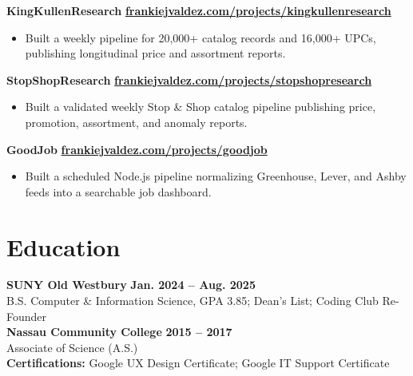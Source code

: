 \documentclass[10pt,letterpaper]{article}
\newcommand{\resumeTitle}[1]{{\fontsize{9.65}{11.35}\selectfont\textbf{#1}}}
\begin{document}
\resumeTitle{KingKullenResearch} \hfill \href{https://frankiejvaldez.com/projects/kingkullenresearch/}{\resumeTitle{frankiejvaldez.com/projects/kingkullenresearch}}
\begin{itemize}
  \item Built a weekly pipeline for 20,000+ catalog records and 16,000+ UPCs, publishing longitudinal price and assortment reports.
\end{itemize}

\resumeTitle{StopShopResearch} \hfill \href{https://frankiejvaldez.com/projects/stopshopresearch/}{\resumeTitle{frankiejvaldez.com/projects/stopshopresearch}}
\begin{itemize}
  \item Built a validated weekly Stop \& Shop catalog pipeline publishing price, promotion, assortment, and anomaly reports.
\end{itemize}

\resumeTitle{GoodJob} \hfill \href{https://frankiejvaldez.com/projects/goodjob/}{\resumeTitle{frankiejvaldez.com/projects/goodjob}}
\begin{itemize}
  \item Built a scheduled Node.js pipeline normalizing Greenhouse, Lever, and Ashby feeds into a searchable job dashboard.
\end{itemize}

\section*{Education}
\resumeTitle{SUNY Old Westbury} \hfill \resumeTitle{Jan. 2024 -- Aug. 2025}\\[1.5pt]
B.S. Computer \& Information Science, GPA 3.85; Dean's List; Coding Club Re-Founder\\[3pt]
\resumeTitle{Nassau Community College} \hfill \resumeTitle{2015 -- 2017}\\[1.5pt]
Associate of Science (A.S.)\\[3pt]
\resumeTitle{Certifications:} Google UX Design Certificate; Google IT Support Certificate
\end{document}
